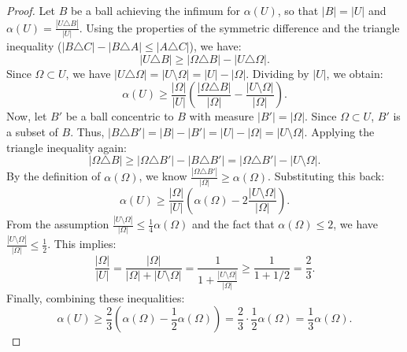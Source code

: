 \documentclass[oneside,a4paper,11pt,notitlepage]{article}
\theoremstyle{definition}
\theoremstyle{plain}
\theoremstyle{definition}
\begin{document}
\begin{proof}
    Let $B$ be a ball achieving the infimum for $\alpha(U)$, so that $|B| = |U|$ and $\alpha(U) = \frac{|U \triangle B|}{|U|}$. Using the properties of the symmetric difference and the triangle inequality ($|B \triangle C| - |B \triangle A|\leq|A \triangle C|$), we have:
    \begin{equation*}
        |U \triangle B| \geq |\Omega \triangle B| - |U \triangle \Omega|.
    \end{equation*}
    Since $\Omega \subset U$, we have $|U \triangle \Omega| = |U \setminus \Omega| = |U| - |\Omega|$. Dividing by $|U|$, we obtain:
    \begin{equation*}
        \alpha(U) \geq \frac{|\Omega|}{|U|} \left( \frac{|\Omega \triangle B|}{|\Omega|} - \frac{|U \setminus \Omega|}{|\Omega|} \right).
    \end{equation*}
    Now, let $B'$ be a ball concentric to $B$ with measure $|B'| = |\Omega|$. Since $\Omega \subset U$, $B'$ is a subset of $B$. Thus, $|B \triangle B'| = |B| - |B'| = |U| - |\Omega| = |U \setminus \Omega|$. Applying the triangle inequality again:
    \begin{equation*}
        |\Omega \triangle B| \geq |\Omega \triangle B'| - |B \triangle B'| = |\Omega \triangle B'| - |U \setminus \Omega|.
    \end{equation*}
    By the definition of $\alpha(\Omega)$, we know $\frac{|\Omega \triangle B'|}{|\Omega|} \geq \alpha(\Omega)$. Substituting this back:
    \begin{equation*}
        \alpha(U) \geq \frac{|\Omega|}{|U|} \left( \alpha(\Omega) - 2\frac{|U \setminus \Omega|}{|\Omega|} \right).
    \end{equation*}
    From the assumption $\frac{|U \setminus \Omega|}{|\Omega|} \leq \frac{1}{4}\alpha(\Omega)$ and the fact that $\alpha(\Omega) \leq 2$, we have $\frac{|U \setminus \Omega|}{|\Omega|} \leq \frac{1}{2}$. This implies:
    \begin{equation*}
        \frac{|\Omega|}{|U|} = \frac{|\Omega|}{|\Omega| + |U \setminus \Omega|} = \frac{1}{1 + \frac{|U \setminus \Omega|}{|\Omega|}} \geq \frac{1}{1 + 1/2} = \frac{2}{3}.
    \end{equation*}
    Finally, combining these inequalities:
    \begin{equation*}
        \alpha(U) \geq \frac{2}{3} \left( \alpha(\Omega) - \frac{1}{2}\alpha(\Omega) \right) = \frac{2}{3} \cdot \frac{1}{2}\alpha(\Omega) = \frac{1}{3}\alpha(\Omega).
    \end{equation*}
\end{proof}
\end{document}
